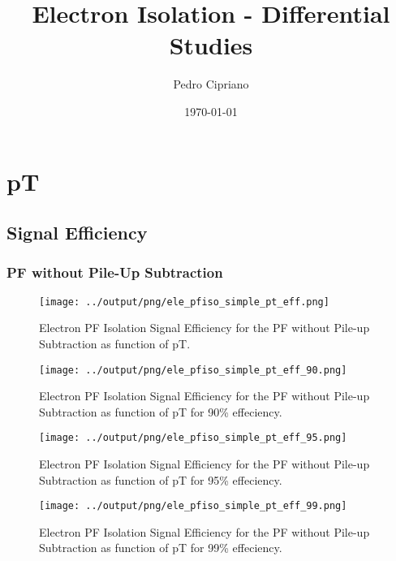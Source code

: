 \documentclass[11pt]{book}
\begin{document}
         
 
 \author{Pedro Cipriano}
 \date{\today}
 \title{Electron Isolation - Differential Studies}

\maketitle

\tableofcontents


\chapter{pT}

\section{Signal Efficiency}
\subsection{PF without Pile-Up Subtraction}
\begin{figure}[htb]
\centering
\texttt{[image: ../output/png/ele\_pfiso\_simple\_pt\_eff.png]}
\caption{Electron PF Isolation Signal Efficiency for the PF without Pile-up Subtraction as function of pT.}
\label{fig:ele_pfiso_pt_eff_simple}
\end{figure}

\begin{figure}[htb]
\centering
\texttt{[image: ../output/png/ele\_pfiso\_simple\_pt\_eff\_90.png]}
\caption{Electron PF Isolation Signal Efficiency for the PF without Pile-up Subtraction as function of pT for 90\% effeciency.}
\label{fig:ele_pfiso_pt_eff_simple_eff_90}
\end{figure}

\begin{figure}[htb]
\centering
\texttt{[image: ../output/png/ele\_pfiso\_simple\_pt\_eff\_95.png]}
\caption{Electron PF Isolation Signal Efficiency for the PF without Pile-up Subtraction as function of pT for 95\% effeciency.}
\label{fig:ele_pfiso_pt_eff_simple_eff_95}
\end{figure}

\begin{figure}[htb]
\centering
\texttt{[image: ../output/png/ele\_pfiso\_simple\_pt\_eff\_99.png]}
\caption{Electron PF Isolation Signal Efficiency for the PF without Pile-up Subtraction as function of pT for 99\% effeciency.}
\label{fig:ele_pfiso_pt_eff_simple_eff_99}
\end{figure}
\end{document}
